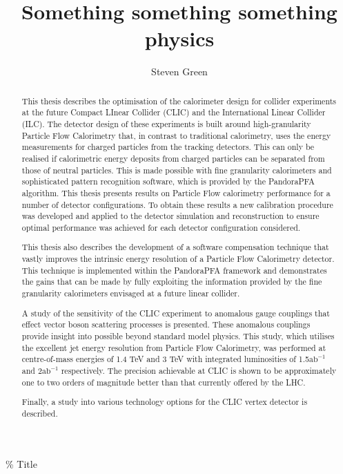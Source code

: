 \documentclass[hyperpdf,bindnopdf]{hepthesis}
\title{Something something something physics}
\author{Steven Green}
\begin{document}
\% Title

\begin{abstract}%
This thesis describes the optimisation of the calorimeter design for collider experiments
at the future Compact LInear Collider (CLIC) and the International Linear Collider (ILC). 
The detector design of these experiments is built around high-granularity Particle Flow Calorimetry
that, in contrast to traditional calorimetry, uses the energy measurements for charged particles from 
the tracking detectors. This can only be realised if calorimetric energy deposits from
charged particles can be separated from those of neutral particles. This is made possible with fine
granularity calorimeters and sophisticated pattern recognition software, which is provided by the
PandoraPFA algorithm. This thesis presents results on Particle Flow calorimetry performance for a number
of detector configurations. To obtain these results a new calibration procedure was developed 
and applied to the detector simulation and reconstruction to ensure optimal performance 
was achieved for each detector configuration considered.

This thesis also describes the development of a software compensation technique that vastly improves the
intrinsic energy resolution of a Particle Flow Calorimetry detector. This technique is implemented
within the PandoraPFA framework and demonstrates the gains that can be made by fully exploiting
the information provided by the fine granularity calorimeters envisaged at a future linear collider.

A study of the sensitivity of the CLIC experiment to anomalous gauge couplings that
effect vector boson scattering processes is presented. These anomalous couplings provide insight
into possible beyond standard model physics. This study, which utilises the excellent jet energy resolution from
Particle Flow Calorimetry, was performed at centre-of-mass energies of 1.4 TeV and 3 TeV with integrated 
luminosities of 1.5$\text{ab}^{-1}$ and 2$\text{ab}^{-1}$ respectively. The precision achievable at CLIC is shown to be approximately 
one to two orders of magnitude better than that currently offered by the LHC.

Finally, a study into various technology options for the CLIC vertex detector is described.
\end{abstract}
\end{document}
